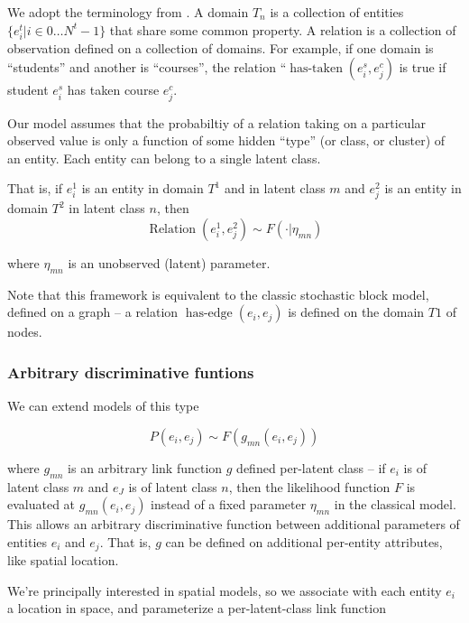 \documentclass{article}
\begin{document}
We adopt the terminology from \autocite{Kemp2006a}. A domain $T_n$ is a
collection of entities $\{e^t_i | i \in 0 \dots N^t -1 \} $ that share
some common property. A relation is a collection of observation
defined on a collection of domains. For example, if one domain is
``students'' and another is ``courses'', the relation
``$\operatorname{has-taken}(e^s_i, e^c_j)$ is true if student $e^s_i$ has
taken course $e^c_j$. 

Our model assumes that the probabiltiy of a relation taking on a
particular observed value is only a function of some hidden ``type''
(or class, or cluster) of an entity. Each entity can belong to a
single latent class.

That is, if $e^1_i$ is an entity
in domain $T^1$ and in latent class $m$ and $e^2_j$ is an entity in
domain $T^2$ in latent class $n$, then 
\begin{equation}
\operatorname{Relation}(e^1_i, e^2_j) \sim F(\cdot | \eta_{mn})
\end{equation}

where $\eta_{mn}$ is an unobserved (latent) parameter.

Note that this framework is equivalent to the classic stochastic block
model, defined on a graph -- a relation $\operatorname{has-edge}(e_i,
e_j)$ is defined on the domain $T1$ of nodes. 

\subsubsection{Arbitrary discriminative funtions}
We can extend models of this type 

\begin{equation}
P(e_i, e_j) \sim F(g_{mn}(e_i, e_j))
\end{equation}

where $g_{mn}$ is an arbitrary link function $g$ defined per-latent
class -- if $e_i$ is of latent class $m$ and $e_J$ is of latent class
$n$, then the likelihood function $F$ is evaluated at $g_{mn}(e_i,
e_j)$ instead of a fixed parameter $\eta_{mn}$ in the classical
model. This allows an arbitrary discriminative function between
additional parameters of entities $e_i$ and $e_j$. That is, $g$ can be
defined on additional per-entity attributes, like spatial location.

We're principally interested in spatial models, so we associate with each
entity $e_i$ a location in space, and parameterize a per-latent-class
link function 
\end{document}
